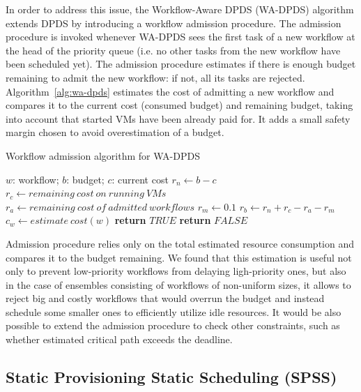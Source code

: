 \documentclass{sig-alternate}
\begin{document}
In order to address this issue, the Workflow-Aware DPDS (WA-DPDS) algorithm extends 
DPDS by introducing a workflow admission procedure. The admission procedure is
invoked whenever WA-DPDS sees the first task of a new workflow at the head of the 
priority queue (i.e. no other tasks from the new workflow have been scheduled yet). 
The admission procedure estimates if there is enough budget remaining to admit the 
new workflow: if not, all its tasks are rejected.
Algorithm~\ref{alg:wa-dpds} estimates the cost of admitting a new workflow and
compares it to the current cost (consumed budget) and remaining budget, taking
into account that started VMs have been already paid for. It adds a small safety
margin chosen to avoid overestimation of a budget.

\begin{algorithm}
\caption{Workflow admission algorithm for WA-DPDS}
\label{alg:wa-dpds}
\begin{algorithmic}[1]
\Require $w$: workflow; $b$: budget; $c$: current cost
    \State $r_n\gets b-c$ 
    \State $r_c\gets remaining\ cost\ on\ running\ VMs$
    \State $r_a\gets remaining\ cost\ of\ admitted\ workflows$
	\State $r_m\gets 0.1$ 
	\State $r_b\gets r_n+r_c-r_a-r_m$ 
	\State $c_w\gets estimate\ cost(w)$
    	\State \textbf{return} $TRUE$
    \Else
    	\State \textbf{return} $FALSE$
	\EndIf    	 
\EndProcedure
\end{algorithmic} 
\end{algorithm}


Admission procedure relies only on the total estimated resource consumption and
compares it to the budget remaining. We found that this estimation is useful not
only to prevent low-priority workflows from delaying ligh-priority ones, but
also in the case of ensembles consisting of workflows of non-uniform sizes, it
allows to reject big and costly workflows that would overrun the budget and
instead schedule some smaller ones to efficiently utilize idle resources. It
would be also possible to extend the admission procedure to check other
constraints, such as whether estimated critical path exceeds the deadline.



\subsection{Static Provisioning Static Scheduling (SPSS)}
\end{document}
